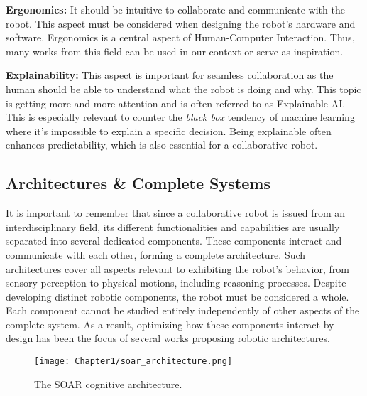 \textbf{Ergonomics:} It should be intuitive to collaborate and communicate with the robot. This aspect must be considered when designing the robot's hardware and software. Ergonomics is a central aspect of Human-Computer Interaction. Thus, many works from this field can be used in our context or serve as inspiration.

\textbf{Explainability:} This aspect is important for seamless collaboration as the human should be able to understand what the robot is doing and why. This topic is getting more and more attention and is often referred to as Explainable AI. This is especially relevant to counter the \textit{black box} tendency of machine learning where it's impossible to explain a specific decision. Being explainable often enhances predictability, which is also essential for a collaborative robot.

\subsection{Architectures \& Complete Systems}

It is important to remember that since a collaborative robot is issued from an interdisciplinary field, its different functionalities and capabilities are usually separated into several dedicated components. These components interact and communicate with each other, forming a complete architecture. Such architectures cover all aspects relevant to exhibiting the robot's behavior, from sensory perception to physical motions, including reasoning processes. 
Despite developing distinct robotic components, the robot must be considered a whole. Each component cannot be studied entirely independently of other aspects of the complete system. As a result, optimizing how these components interact by design has been the focus of several works proposing robotic architectures.

\begin{figure}
    \center
    \texttt{[image: Chapter1/soar\_architecture.png]}
    \caption{The SOAR cognitive architecture.}
    \label{fig:soar}
\end{figure}


